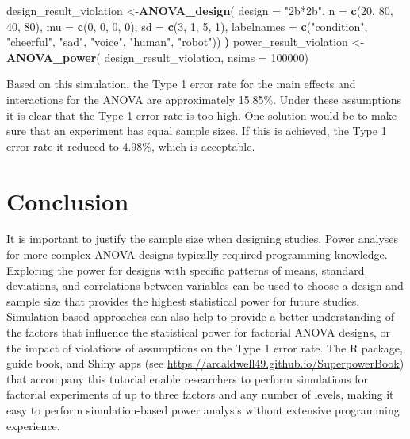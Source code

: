 \documentclass[,man,floatsintext]{apa6}
\newenvironment{Shaded}{\begin{snugshade}}{\end{snugshade}}
\newcommand{\DataTypeTok}[1]{\textcolor[rgb]{0.13,0.29,0.53}{#1}}
\newcommand{\DecValTok}[1]{\textcolor[rgb]{0.00,0.00,0.81}{#1}}
\newcommand{\ErrorTok}[1]{\textcolor[rgb]{0.64,0.00,0.00}{\textbf{#1}}}
\newcommand{\KeywordTok}[1]{\textcolor[rgb]{0.13,0.29,0.53}{\textbf{#1}}}
\newcommand{\NormalTok}[1]{#1}
\newcommand{\StringTok}[1]{\textcolor[rgb]{0.31,0.60,0.02}{#1}}
\begin{document}
\begin{Shaded}
\begin{Highlighting}[]
\NormalTok{design_result_violation <-}\KeywordTok{ANOVA_design}\NormalTok{(}
  \DataTypeTok{design =} \StringTok{"2b*2b"}\NormalTok{,}
  \DataTypeTok{n =} \KeywordTok{c}\NormalTok{(}\DecValTok{20}\NormalTok{, }\DecValTok{80}\NormalTok{, }\DecValTok{40}\NormalTok{, }\DecValTok{80}\NormalTok{),}
  \DataTypeTok{mu =} \KeywordTok{c}\NormalTok{(}\DecValTok{0}\NormalTok{, }\DecValTok{0}\NormalTok{, }\DecValTok{0}\NormalTok{, }\DecValTok{0}\NormalTok{),}
  \DataTypeTok{sd =} \KeywordTok{c}\NormalTok{(}\DecValTok{3}\NormalTok{, }\DecValTok{1}\NormalTok{, }\DecValTok{5}\NormalTok{, }\DecValTok{1}\NormalTok{),}
  \DataTypeTok{labelnames =} \KeywordTok{c}\NormalTok{(}\StringTok{"condition"}\NormalTok{, }\StringTok{"cheerful"}\NormalTok{, }\StringTok{"sad"}\NormalTok{, }\StringTok{"voice"}\NormalTok{, }\StringTok{"human"}\NormalTok{, }\StringTok{"robot"}\NormalTok{))}
\ErrorTok{)}
\NormalTok{power_result_violation <-}\StringTok{ }\KeywordTok{ANOVA_power}\NormalTok{(}
\NormalTok{  design_result_violation,}
  \DataTypeTok{nsims =} \DecValTok{100000}\NormalTok{)}
\end{Highlighting}
\end{Shaded}

Based on this simulation, the Type 1 error rate for the main effects and interactions for the ANOVA are approximately 15.85\%.
Under these assumptions it is clear that the Type 1 error rate is too high.
One solution would be to make sure that an experiment has equal sample sizes.
If this is achieved, the Type 1 error rate it reduced to 4.98\%, which is acceptable.

\hypertarget{conclusion}{%
\section{Conclusion}\label{conclusion}}

It is important to justify the sample size when designing studies.
Power analyses for more complex ANOVA designs typically required programming knowledge.
Exploring the power for designs with specific patterns of means, standard deviations, and correlations between variables can be used to choose a design and sample size that provides the highest statistical power for future studies.
Simulation based approaches can also help to provide a better understanding of the factors that influence the statistical power for factorial ANOVA designs, or the impact of violations of assumptions on the Type 1 error rate.
The R package, guide book, and Shiny apps (see \url{https://arcaldwell49.github.io/SuperpowerBook}) that accompany this tutorial enable researchers to perform simulations for factorial experiments of up to three factors and any number of levels, making it easy to perform simulation-based power analysis without extensive programming experience.
\end{document}
